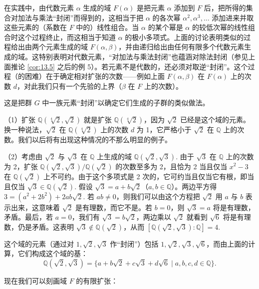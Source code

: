 在实践中，由代数元素 \(\alpha\) 生成的域 \(F(\alpha)\) 是把元素 \(\alpha\) 添加到 \(F\) 后，把所得的集合对加法与乘法“封闭”而得到的，这相当于把 \(\alpha\) 的各次幂 \(\alpha^2, \alpha^3, \ldots\) 添加进来并取这些元素的（系数在 \(F\) 中的）线性组合。当 \(\alpha\) 的某个幂是 \(\alpha\) 的较低次幂的线性组合时这个过程终止，而这相当于知道 \(\alpha\) 的极小多项式。上面的讨论表明类似的过程给出由两个元素生成的域 \(F(\alpha, \beta)\)，并由递归给出由任何有限多个代数元素生成的域。这特别表明对代数元素，“对加法与乘法封闭”也蕴涵对除法封闭（参见上面推论 \ref{cor:13.5} 之后的例 5）。若元素不是代数的，还必须对取逆“封闭”。这个过程（的困难）在于确定相对扩张的次数——例如上面 \(F(\alpha, \beta)\) 在 \(F(\alpha)\) 上的次数 \(d\)，对此我们只有一个先验的上界（\(\beta\) 在 \(F\) 上的次数）。

这是把群 \(G\) 中一族元素“封闭”以确定它们生成的子群的类似做法。

\begin{example}
（1）扩张 \(\mathbb{Q}(\sqrt[4]{2}, \sqrt{2})\) 就是扩张 \(\mathbb{Q}(\sqrt[4]{2})\)，因为 \(\sqrt{2}\) 已经是这个域的元素。换一种说法，\(\sqrt{2}\) 在 \(\mathbb{Q}(\sqrt[4]{2})\) 上的次数 \(d\) 为 1，它严格小于 \(\sqrt{2}\) 在 \(\mathbb{Q}\) 上的次数。我们以后将有出现这种情况的不那么明显的例子。

（2）考虑由 \(\sqrt{2}\) 与 \(\sqrt{3}\) 在 \(\mathbb{Q}\) 上生成的域 \(\mathbb{Q}(\sqrt{2}, \sqrt{3})\). 由于 \(\sqrt{3}\) 在 \(\mathbb{Q}\) 上的次数为 2，扩张 \(\mathbb{Q}(\sqrt{2}, \sqrt{3})/\mathbb{Q}(\sqrt{2})\) 的次数至多为 2，且恰为 2 当且仅当 \(x^2-3\) 在 \(\mathbb{Q}(\sqrt{2})\) 上不可约。由于这个多项式是 2 次的，它可约当且仅当它有根，即当且仅当 \(\sqrt{3} \in \mathbb{Q}(\sqrt{2})\). 假设 \(\sqrt{3} = a+b\sqrt{2}\)（\(a, b \in \mathbb{Q}\)）。两边平方得 \(3 = (a^2+2b^2)+2ab\sqrt{2}\). 若 \(ab \neq 0\)，则我们可以由这个方程把 \(\sqrt{2}\) 用 \(a\) 与 \(b\) 表示出来，这意味着 \(\sqrt{2}\) 是有理数，而它不是。若 \(b = 0\)，则 \(\sqrt{3} = a\) 将是有理数，矛盾。最后，若 \(a = 0\)，我们有 \(\sqrt{3} = b\sqrt{2}\)，两边乘以 \(\sqrt{2}\) 就看到 \(\sqrt{6}\) 将是有理数，仍是矛盾。这表明 \(\sqrt{3} \notin \mathbb{Q}(\sqrt{2})\)，从而 \([\mathbb{Q}(\sqrt{2}, \sqrt{3}):\mathbb{Q}] = 4\).

这个域的元素（通过对 \(1, \sqrt{2}, \sqrt{3}\) 作“封闭”）包括 \(1, \sqrt{2}, \sqrt{3}, \sqrt{6}\)，而由上面的计算，它们构成这个域的基：
\[
\mathbb{Q}(\sqrt{2}, \sqrt{3}) = \{a+b\sqrt{2}+c\sqrt{3}+d\sqrt{6} \mid a, b, c, d \in \mathbb{Q}\}.
\]
\end{example}

现在我们可以刻画域 \(F\) 的有限扩张：

